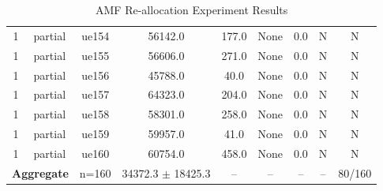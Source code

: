 \begin{table}[ht]
\begin{tabular}{|c|c|c|c|c|c|c|c|c|}
1 & partial & ue154 & 56142.0 & 177.0 & None & 0.0 & N & N \\
1 & partial & ue155 & 56606.0 & 271.0 & None & 0.0 & N & N \\
1 & partial & ue156 & 45788.0 & 40.0 & None & 0.0 & N & N \\
1 & partial & ue157 & 64323.0 & 204.0 & None & 0.0 & N & N \\
1 & partial & ue158 & 58301.0 & 258.0 & None & 0.0 & N & N \\
1 & partial & ue159 & 59957.0 & 41.0 & None & 0.0 & N & N \\
1 & partial & ue160 & 60754.0 & 458.0 & None & 0.0 & N & N \\
\multicolumn{2}{|c|}{\textbf{Aggregate}} & n=160 & 34372.3 $\pm$ 18425.3 & -- & -- & -- & -- & 80/160 \\
\hline
\end{tabular}
\caption{AMF Re-allocation Experiment Results}
\label{tab:amf_realloc}
\end{table}
